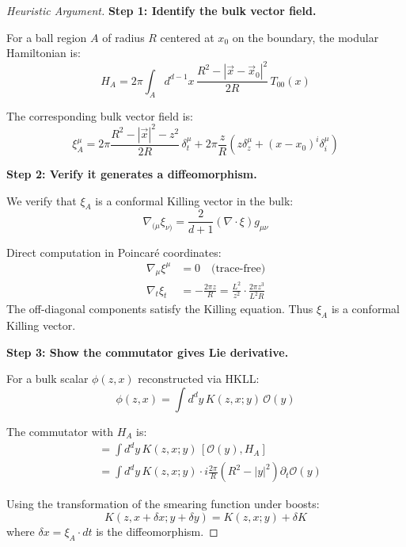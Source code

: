 \documentclass[12pt,a4paper]{article}
\begin{document}
\begin{proof}[Heuristic Argument]
\textbf{Step 1: Identify the bulk vector field.}

For a ball region $A$ of radius $R$ centered at $x_0$ on the boundary, the modular Hamiltonian is:
\begin{equation}
H_A = 2\pi \int_A d^{d-1}x \, \frac{R^2 - |\vec{x} - \vec{x}_0|^2}{2R} \, T_{00}(x)
\end{equation}

The corresponding bulk vector field is:
\begin{equation}
\xi_A^\mu = 2\pi \frac{R^2 - |\vec{x}|^2 - z^2}{2R} \, \delta^\mu_t + 2\pi \frac{z}{R} \left( z \delta^\mu_z + (x - x_0)^i \delta^\mu_i \right)
\end{equation}

\textbf{Step 2: Verify it generates a diffeomorphism.}

We verify that $\xi_A$ is a conformal Killing vector in the bulk:
\begin{equation}
\nabla_{(\mu}\xi_{\nu)} = \frac{2}{d+1}(\nabla \cdot \xi) g_{\mu\nu}
\end{equation}

Direct computation in Poincar\'e coordinates:
\begin{align}
\nabla_\mu \xi^\mu &= 0 \quad \text{(trace-free)} \\
\nabla_t \xi_t &= -\frac{2\pi z}{R} = \frac{L^2}{z^2} \cdot \frac{2\pi z^3}{L^2 R}
\end{align}
The off-diagonal components satisfy the Killing equation. Thus $\xi_A$ is a conformal Killing vector.

\textbf{Step 3: Show the commutator gives Lie derivative.}

For a bulk scalar $\phi(z, x)$ reconstructed via HKLL:
\begin{equation}
\phi(z, x) = \int d^dy \, K(z, x; y) \, \mathcal{O}(y)
\end{equation}

The commutator with $H_A$ is:
\begin{align}
[\phi(z, x), H_A] &= \int d^dy \, K(z, x; y) \, [\mathcal{O}(y), H_A] \\
&= \int d^dy \, K(z, x; y) \cdot i \frac{2\pi}{R}(R^2 - |y|^2) \partial_t \mathcal{O}(y)
\end{align}

Using the transformation of the smearing function under boosts:
\begin{equation}
K(z, x + \delta x; y + \delta y) = K(z, x; y) + \delta K
\end{equation}
where $\delta x = \xi_A \cdot dt$ is the diffeomorphism.


\end{proof}
\end{document}
